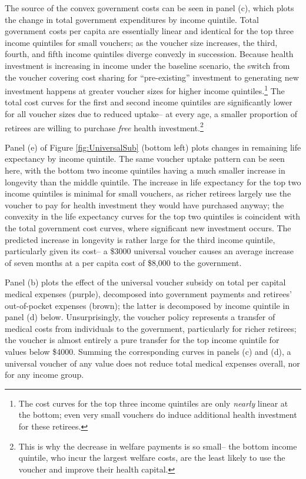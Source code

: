 \documentclass[12pt,pdftex,letterpaper]{article}
\begin{document}
The source of the convex government costs can be seen in panel (c), which plots the change in total government expenditures by income quintile.  Total government costs per capita are essentially linear and identical for the top three income quintiles for small vouchers; as the voucher size increases, the third, fourth, and fifth income quintiles diverge convexly in succession.  Because health investment is increasing in income under the baseline scenario, the switch from the voucher covering cost sharing for ``pre-existing'' investment to generating new investment happens at greater voucher sizes for higher income quintiles.\footnote{The cost curves for the top three income quintiles are only \textit{nearly} linear at the bottom; even very small vouchers do induce additional health investment for these retirees.}  The total cost curves for the first and second income quintiles are significantly lower for all voucher sizes due to reduced uptake-- at every age, a smaller proportion of retirees are willing to purchase \textit{free} health investment.\footnote{This is why the decrease in welfare payments is so small-- the bottom income quintile, who incur the largest welfare costs, are the least likely to use the voucher and improve their health capital.}

Panel (e) of Figure \ref{fig:UniversalSub} (bottom left) plots changes in remaining life expectancy by income quintile.  The same voucher uptake pattern can be seen here, with the bottom two income quintiles having a much smaller increase in longevity than the middle quintile.  The increase in life expectancy for the top two income quintiles is minimal for small vouchers, as richer retirees largely use the voucher to pay for health investment they would have purchased anyway; the convexity in the life expectancy curves for the top two quintiles is coincident with the total government cost curves, where significant new investment occurs.  The predicted increase in longevity is rather large for the third income quintile, particularly given its cost-- a \$3000 universal voucher causes an average increase of seven months at a per capita cost of \$8,000 to the government.

Panel (b) plots the effect of the universal voucher subsidy on total per capital medical expenses (purple), decomposed into government payments and retirees' out-of-pocket expenses (brown); the latter is decomposed by income quintile in panel (d) below.  Unsurprisingly, the voucher policy represents a transfer of medical costs from individuals to the government, particularly for richer retirees; the voucher is almost entirely a pure transfer for the top income quintile for values below \$4000.  Summing the corresponding curves in panels (c) and (d), a universal voucher of any value does not reduce total medical expenses overall, nor for any income group.
\end{document}
